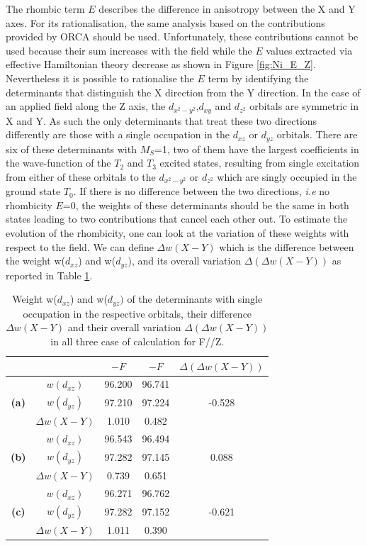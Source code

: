 \documentclass[12pt]{report}
\numberwithin{equation}{section}
\begin{document}
The rhombic term $E$ describes the difference in anisotropy between the X and Y axes. For its rationalisation, the same analysis based on the contributions provided by ORCA should be used.
Unfortunately, these contributions cannot be used because their sum increases with the field while the $E$ values extracted via effective Hamiltonian theory decrease as shown in Figure \ref{fig:Ni_E_Z}.
Nevertheless it is possible to rationalise the $E$ term by identifying the determinants that distinguish the X direction from the Y direction. 
In the case of an applied field along the Z axis, the $d_{x^2-y^2}$,$d_{xy}$ and $d_{z^2}$ orbitals are symmetric in X and Y. As such the only determinants that treat these two directions differently are those with a single occupation in the $d_{xz}$ or $d_{yz}$ orbitals.
There are six of these determinants with $M_S$=1, two of them have the largest coefficients in the wave-function of the $T_2$ and $T_3$ excited states, resulting from single excitation from either of these orbitals to the $d_{x^2-y^2}$ or $d_{z^2}$ which are singly occupied in the ground state $T_0$.
If there is no difference between the two directions, \textit{i.e} no rhombicity $E$=0, the weights of these determinants should be the same in both states leading to two contributions that cancel each other out. 
To estimate the evolution of the rhombicity, one can look at the variation of these weights with respect to the field.
We can define $\Delta w(X-Y)$ which is the difference between the weight w($d_{xz}$) and w($d_{yz}$), and its overall variation $\Delta (\Delta w(X-Y))$ as reported in Table \ref{tab:PoidsZ}.

\begin{table}[h]
    \centering
    \begin{tabular}{c | c | c c | c }
        & &  $-F$ & $-F$ & $\Delta (\Delta w(X-Y))$\\
        \hline
        \multirow{3}{*}{\textbf{(a)}}
        &$w(d_{xz})$ &  96.200 & 96.741 & \\
        &$w(d_{yz})$ &  97.210 & 97.224 & -0.528\\
        &$\Delta w(X-Y)$ & 1.010 & 0.482& \\
        \hline
        \multirow{3}{*}{\textbf{(b)}}
        &$w(d_{xz})$ &  96.543 & 96.494 & \\
        &$w(d_{yz})$ &  97.282 & 97.145 & 0.088\\
        &$\Delta w(X-Y)$ & 0.739 & 0.651& \\
        \hline
        \multirow{3}{*}{\textbf{(c)}}
        &$w(d_{xz})$ &  96.271 & 96.762 & \\
        &$w(d_{yz})$ &  97.282 & 97.152 & -0.621\\
        &$\Delta w(X-Y)$ & 1.011 & 0.390& \\
        \hline
    \end{tabular}
    \caption{Weight w($d_{xz}$) and w($d_{yz})$ of the determinants with single occupation in the respective orbitals, their difference $\Delta w(X-Y)$ and their overall variation $\Delta (\Delta w(X-Y))$ in all three case of calculation for F//Z. }
    \label{tab:PoidsZ}
\end{table}
\end{document}
